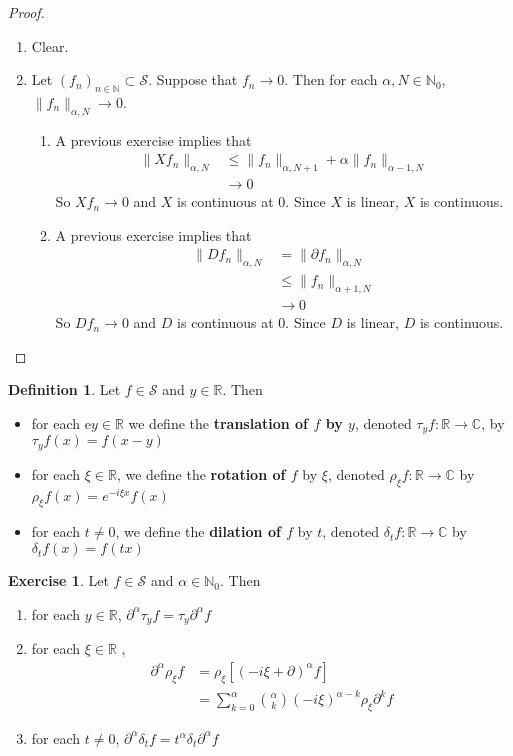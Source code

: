 \documentclass[12pt]{amsart}
\theoremstyle{definition}
\newtheorem{defn}[definition]{Definition}
\newtheorem{ex}[definition]{Exercise}
\newcommand{\p}{\partial}
\newcommand{\al}{\alpha}
\newcommand{\del}{\delta}
\newcommand{\C}{\mathbb{C}}
\newcommand{\N}{\mathbb{N}}
\newcommand{\R}{\mathbb{R}}
\newcommand{\MS}{\mathcal{S}}
\begin{document}
	\begin{proof}\
		\begin{enumerate}
			\item Clear.
			\item Let $(f_n)_{n \in \N} \subset \MS$. Suppose that $f_n \rightarrow 0$. Then for each $\al, N \in \N_0$, $\|f_n\|_{\al, N} \rightarrow 0$.
			\begin{enumerate}
				\item A previous exercise implies that 
				\begin{align*}
					\|Xf_n\|_{\al, N} 
					& \leq \|f_n\|_{\al, N+1} + \al \|f_n\|_{\al-1, N} \\
					& \rightarrow 0
				\end{align*}
				So $Xf_n \rightarrow 0$ and $X$ is continuous at $0$. Since $X$ is linear, $X$ is continuous.
				\item A previous exercise implies that 
				\begin{align*}
					\|Df_n\|_{\al, N} 
					& = \|\p f_n\|_{\al, N} \\
					& \leq \|f_n\|_{\al+1, N}\\
					& \rightarrow 0
				\end{align*}
				So $Df_n \rightarrow 0$ and $D$ is continuous at $0$. Since $D$ is linear, $D$ is continuous. 
			\end{enumerate}
		\end{enumerate}
	\end{proof}

	\begin{defn}
		Let $f \in \MS$ and $y \in \R$. Then
		\begin{itemize}
			\item for each e$y \in \R$ we define the \textbf{translation of $f$ by $y$}, denoted $\tau_yf: \R \rightarrow \C$, by $\tau_yf(x) = f(x-y)$
			\item for each $\xi \in \R$, we define the \textbf{rotation of $f$} by $\xi$, denoted $\rho_{\xi} f: \R \rightarrow \C$ by $\rho_{\xi}f(x) = e^{-i\xi x}f(x)$
			\item for each $t \neq 0$, we define the \textbf{dilation of $f$} by $t$, denoted $\del_t f: \R \rightarrow \C$ by $\del_tf(x) = f(tx)$
		\end{itemize}
	\end{defn}

	\begin{ex}
		Let $f \in \MS$ and $\al \in \N_0$.  Then   
		\begin{enumerate}
			\item for each $y \in \R$, $\p^{\al}\tau_yf = \tau_y \p^{\al}f$ 
			\item for each $\xi \in \R$ ,
			\begin{align*}
				\p^{\al} \rho_{\xi} f 
				& =  \rho_{\xi} [(-i\xi + \p)^{\al}f] \\ 
				& =   \sum\limits_{k=0}^{\al} {\al \choose k} (-i\xi)^{\al-k}\rho_{\xi}\p^{k}f 
			\end{align*}
			\item for each $t \neq 0$, $\p^{\al} \del_tf = t^{\al} \del_t \p^{\al}f$
		\end{enumerate}
	\end{ex}
\end{document}
